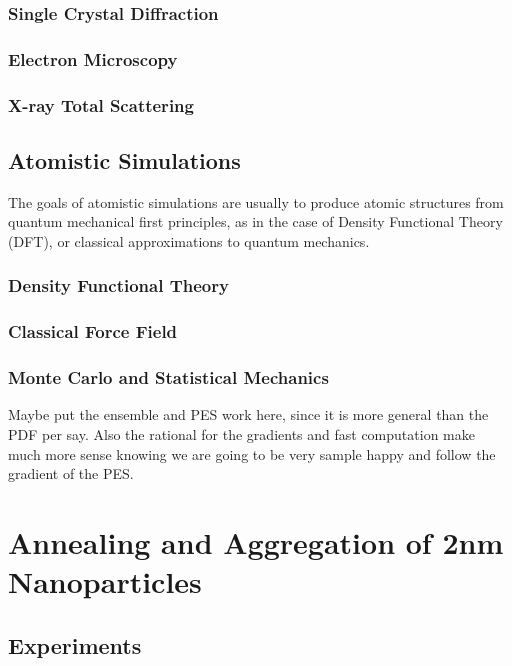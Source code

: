 \documentclass{uscthesis}
\theoremstyle{definition}
\theoremstyle{plain}
\begin{document}
\subsection{Single Crystal Diffraction}
\subsection{Electron Microscopy}
\subsection{X-ray Total Scattering}

\section{Atomistic Simulations}
The goals of atomistic simulations are usually to produce atomic structures from quantum mechanical first principles, as in the case of Density Functional Theory (DFT), or classical approximations to quantum mechanics.
\subsection{Density Functional Theory}
\subsection{Classical Force Field}
\subsection{Monte Carlo and Statistical Mechanics}

Maybe put the ensemble and PES work here, since it is more general than the PDF per say. Also the rational for the gradients and fast computation make much more sense knowing we are going to be very sample happy and follow the gradient of the PES.



\graphicspath{{./pdf/figures/}}




\chapter{Annealing and Aggregation of 2nm \\ Nanoparticles}
\section{Experiments}
\end{document}
